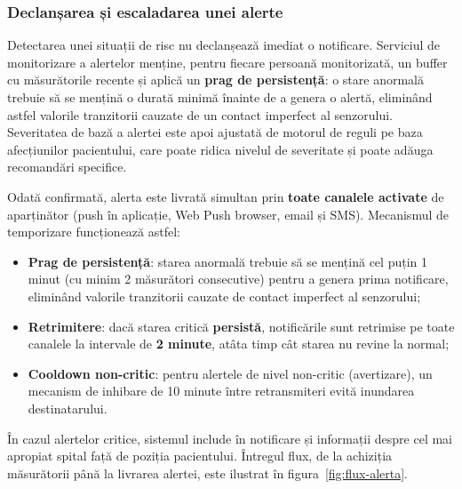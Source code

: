 \documentclass[12pt,a4paper,twoside]{article}
\begin{document}
\subsubsection{Declanșarea și escaladarea unei alerte}

Detectarea unei situații de risc nu declanșează imediat o notificare. Serviciul de monitorizare a alertelor menține, pentru fiecare persoană monitorizată, un buffer cu măsurătorile recente și aplică un \textbf{prag de persistență}: o stare anormală trebuie să se mențină o durată minimă înainte de a genera o alertă, eliminând astfel valorile tranzitorii cauzate de un contact imperfect al senzorului. Severitatea de bază a alertei este apoi ajustată de motorul de reguli pe baza afecțiunilor pacientului, care poate ridica nivelul de severitate și poate adăuga recomandări specifice.

Odată confirmată, alerta este livrată simultan prin \textbf{toate canalele activate} de aparținător (push în aplicație, Web Push browser, email și SMS). Mecanismul de temporizare funcționează astfel:

\begin{itemize}[leftmargin=1.5em]
\item \textbf{Prag de persistență}: starea anormală trebuie să se mențină cel puțin 1 minut (cu minim 2 măsurători consecutive) pentru a genera prima notificare, eliminând valorile tranzitorii cauzate de contact imperfect al senzorului;
\item \textbf{Retrimitere}: dacă starea critică \textbf{persistă}, notificările sunt retrimise pe toate canalele la intervale de \textbf{2 minute}, atâta timp cât starea nu revine la normal;
\item \textbf{Cooldown non-critic}: pentru alertele de nivel non-critic (avertizare), un mecanism de inhibare de 10 minute între retransmiteri evită inundarea destinatarului.
\end{itemize} În cazul alertelor critice, sistemul include în notificare și informații despre cel mai apropiat spital față de poziția pacientului. Întregul flux, de la achiziția măsurătorii până la livrarea alertei, este ilustrat în figura~\ref{fig:flux-alerta}.
\end{document}
